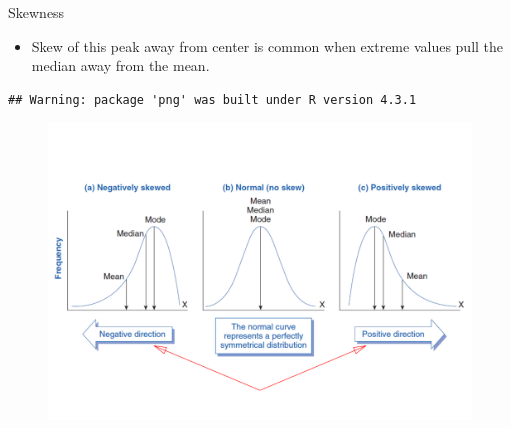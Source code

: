 \documentclass[
  ignorenonframetext,
]{beamer}
\providecommand{\tightlist}{%
  \setlength{\itemsep}{0pt}\setlength{\parskip}{0pt}}
\begin{document}
\begin{frame}[fragile]{Skewness}
\label{skewness-2}
\begin{itemize}
\tightlist
\item
  Skew of this peak away from center is common when extreme values pull
  the median away from the mean.
\end{itemize}

\begin{verbatim}
## Warning: package 'png' was built under R version 4.3.1
\end{verbatim}

\begin{figure}
\includegraphics[width=0.8\linewidth]{M4-Descriptice-Statistics_files/figure-beamer/unnamed-chunk-13-1} \end{figure}
\end{frame}
\end{document}
